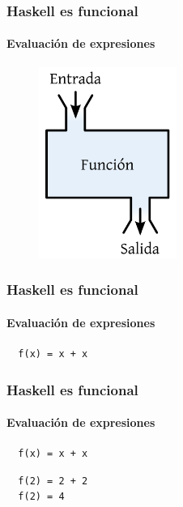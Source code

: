 \documentclass{beamer}
\begin{document}
\begin{frame}[fragile]
  \frametitle{Haskell es funcional}
  \framesubtitle{Evaluación de expresiones}

\begin{figure}
  \includegraphics[width=0.4\textwidth]{img/function.png}
\end{figure}


\end{frame}



\begin{frame}[fragile]
  \frametitle{Haskell es funcional}
  \framesubtitle{Evaluación de expresiones}


\begin{verbatim}
  f(x) = x + x
\end{verbatim}

\end{frame}


\begin{frame}[fragile]
  \frametitle{Haskell es funcional}
  \framesubtitle{Evaluación de expresiones}

\begin{verbatim}
  f(x) = x + x
\end{verbatim}
\vspace{-0.5cm}
\color{blue} 
\begin{verbatim}
  f(2) = 2 + 2
  f(2) = 4 
\end{verbatim}

\end{frame}
\end{document}
